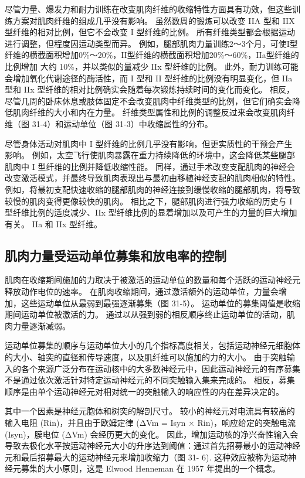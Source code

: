 尽管力量、爆发力和耐力训练在改变肌肉纤维的收缩特性方面具有功效，但这些训练方案对肌肉纤维的组成几乎没有影响。 虽然数周的锻炼可以改变 IIA 型和 IIX 型纤维的相对比例，但它不会改变 I 型纤维的比例。 所有纤维类型都会根据运动进行调整，但程度因运动类型而异。 例如，腿部肌肉力量训练2～3个月，可使I型纤维的横截面积增加0\%～20\%，II型纤维的横截面积增加20\%～60\%，IIa型纤维的比例增加 大约 10\%，并以类似的量减少 IIx 型纤维的比例。 此外，耐力训练可能会增加氧化代谢途径的酶活性，而 I 型和 II 型纤维的比例没有明显变化，但 IIa 型和 IIx 型纤维的相对比例确实会随着每次锻炼持续时间的变化而变化。 相反，尽管几周的卧床休息或肢体固定不会改变肌肉中纤维类型的比例，但它们确实会降低肌肉纤维的大小和内在力量。 纤维类型属性和比例的调整反过来会改变肌肉纤维（图 31-4）和运动单位（图 31-3）中收缩属性的分布。

尽管身体活动对肌肉中 I 型纤维的比例几乎没有影响，但更实质性的干预会产生影响。 例如，太空飞行使肌肉暴露在重力持续降低的环境中，这会降低某些腿部肌肉中 I 型纤维的比例并降低收缩性能。 同样，通过手术改变支配肌肉的神经会改变激活模式，并最终导致肌肉表现出与最初由移植神经支配的肌肉相似的特性。 例如，将最初支配快速收缩的腿部肌肉的神经连接到缓慢收缩的腿部肌肉，将导致较慢的肌肉变得更像较快的肌肉。 相比之下，腿部肌肉进行强力收缩的历史与 I 型纤维比例的适度减少、IIx 型纤维比例的显着增加以及可产生的力量的巨大增加有关。 IIa 和 IIx 型纤维。


\subsection{肌肉力量受运动单位募集和放电率的控制}
肌肉在收缩期间施加的力取决于被激活的运动单位的数量和每个活跃的运动神经元释放动作电位的速率。 在肌肉收缩期间，通过激活额外的运动单位，力量会增加，这些运动单位从最弱到最强逐渐募集（图 31-5）。 运动单位的募集阈值是收缩期间运动单位被激活的力。 通过以从强到弱的相反顺序终止运动单位的活动，肌肉力量逐渐减弱。

运动单位募集的顺序与运动单位大小的几个指标高度相关，包括运动神经元细胞体的大小、轴突的直径和传导速度，以及肌纤维可以施加的力的大小。 由于突触输入的各个来源广泛分布在运动核中的大多数神经元中，因此运动神经元的有序募集不是通过依次激活针对特定运动神经元的不同突触输入集来完成的。 相反，募集顺序是由单个运动神经元对相对统一的突触输入的响应性的内在差异决定的。

其中一个因素是神经元胞体和树突的解剖尺寸。 较小的神经元对电流具有较高的输入电阻 (Rin)，并且由于欧姆定律 (ΔVm = Isyn × Rin)，响应给定的突触电流 (Isyn)，膜电位 (ΔVm) 会经历更大的变化。 因此，增加运动核的净兴奋性输入会导致去极化水平按运动神经元大小的升序达到阈值：通过首先招募最小的运动神经元和最后招募最大的运动神经元来增加收缩力（图 31- 6). 这种效应被称为运动神经元募集的大小原则，这是 Elwood Henneman 在 1957 年提出的一个概念。

